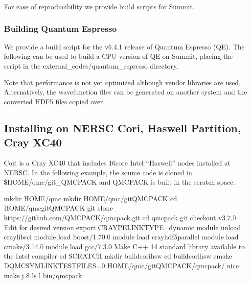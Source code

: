 \documentclass[letterpaper,10pt,english]{sphinxmanual}
\begin{document}
For ease of reproducibility we provide build scripts for Summit.

\begin{sphinxVerbatim}[commandchars=\\\{\}]
 
 
\end{sphinxVerbatim}


\subsubsection{Building Quantum Espresso}
\label{\detokenize{installation:building-quantum-espresso}}
We provide a build script for the v6.4.1 release of Quantum Espresso (QE).
The following can be used to build a CPU version of QE on Summit,
placing the script in the external\_codes/quantum\_espresso directory.

\begin{sphinxVerbatim}[commandchars=\\\{\}]
 
\end{sphinxVerbatim}

Note that performance is
not yet optimized although vendor libraries are
used. Alternatively, the wavefunction files can be generated on
another system and the converted HDF5 files copied over.


\subsection{Installing on NERSC Cori, Haswell Partition, Cray XC40}
\label{\detokenize{installation:installing-on-nersc-cori-haswell-partition-cray-xc40}}
Cori is a Cray XC40 that includes 16\sphinxhyphen{}core Intel “Haswell” nodes
installed at NERSC. In the following example, the source code is
cloned in \$HOME/qmc/git\_QMCPACK and QMCPACK is built in the scratch
space.

\begin{sphinxVerbatim}[commandchars=\\\{\}]
mkdir \PYGZdl{}HOME/qmc
mkdir \PYGZdl{}HOME/qmc/git\PYGZus{}QMCPACK
cd \PYGZdl{}HOME/qmc\PYGZus{}git\PYGZus{}QMCPACK
git clone https://github.com/QMCPACK/qmcpack.git
cd qmcpack
git checkout v3.7.0 \PYGZsh{} Edit for desired version
export CRAYPE\PYGZus{}LINK\PYGZus{}TYPE=dynamic
module unload cray\PYGZhy{}libsci
module load boost/1.70.0
module load cray\PYGZhy{}hdf5\PYGZhy{}parallel
module load cmake/3.14.0
module load gcc/7.3.0 \PYGZsh{} Make C++ 14 standard library available to the Intel compiler
cd \PYGZdl{}SCRATCH
mkdir build\PYGZus{}cori\PYGZus{}hsw
cd build\PYGZus{}cori\PYGZus{}hsw
cmake \PYGZhy{}DQMC\PYGZus{}SYMLINK\PYGZus{}TEST\PYGZus{}FILES=0 \PYGZdl{}HOME/qmc/git\PYGZus{}QMCPACK/qmcpack/
nice make \PYGZhy{}j 8
ls \PYGZhy{}l bin/qmcpack
\end{sphinxVerbatim}
\end{document}
